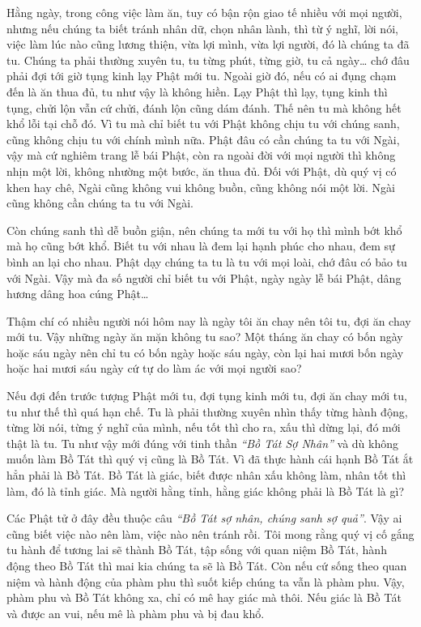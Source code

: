 \documentclass[
  12pt,
  oneside]{book}
\begin{document}
Hằng ngày, trong công việc làm ăn, tuy có bận rộn giao tế nhiều với mọi người, nhưng nếu chúng ta biết tránh nhân dữ, chọn nhân lành, thì từ ý nghĩ, lời nói, việc làm lúc nào cũng lương thiện, vừa lợi mình, vừa lợi người, đó là chúng ta đã tu. Chúng ta phải thường xuyên tu, tu từng phút, từng giờ, tu cả ngày\ldots{} chớ đâu phải đợi tới giờ tụng kinh lạy Phật mới tu. Ngoài giờ đó, nếu có ai đụng chạm đến là ăn thua đủ, tu như vậy là không hiền. Lạy Phật thì lạy, tụng kinh thì tụng, chửi lộn vẫn cứ chửi, đánh lộn cũng dám đánh. Thế nên tu mà không hết khổ lỗi tại chỗ đó. Vì tu mà chỉ biết tu với Phật không chịu tu với chúng sanh, cũng không chịu tu với chính mình nữa. Phật đâu có cần chúng ta tu với Ngài, vậy mà cứ nghiêm trang lễ bái Phật, còn ra ngoài đời với mọi người thì không nhịn một lời, không nhường một bước, ăn thua đủ. Đối với Phật, dù quý vị có khen hay chê, Ngài cũng không vui không buồn, cũng không nói một lời. Ngài cũng không cần chúng ta tu với Ngài.

Còn chúng sanh thì dễ buồn giận, nên chúng ta mới tu với họ thì mình bớt khổ mà họ cũng bớt khổ. Biết tu với nhau là đem lại hạnh phúc cho nhau, đem sự bình an lại cho nhau. Phật dạy chúng ta tu là tu với mọi loài, chớ đâu có bảo tu với Ngài. Vậy mà đa số người chỉ biết tu với Phật, ngày ngày lễ bái Phật, dâng hương dâng hoa cúng Phật\ldots{}

Thậm chí có nhiều người nói hôm nay là ngày tôi ăn chay nên tôi tu, đợi ăn chay mới tu. Vậy những ngày ăn mặn không tu sao? Một tháng ăn chay có bốn ngày hoặc sáu ngày nên chỉ tu có bốn ngày hoặc sáu ngày, còn lại hai mươi bốn ngày hoặc hai mươi sáu ngày cứ tự do làm ác với mọi người sao?

Nếu đợi đến trước tượng Phật mới tu, đợi tụng kinh mới tu, đợi ăn chay mới tu, tu như thế thì quá hạn chế. Tu là phải thường xuyên nhìn thấy từng hành động, từng lời nói, từng ý nghĩ của mình, nếu tốt thì cho ra, xấu thì dừng lại, đó mới thật là tu. Tu như vậy mới đúng với tinh thần \emph{``Bồ Tát Sợ Nhân''} và dù không muốn làm Bồ Tát thì quý vị cũng là Bồ Tát. Vì đã thực hành cái hạnh Bồ Tát ắt hẳn phải là Bồ Tát. Bồ Tát là giác, biết được nhân xấu không làm, nhân tốt thì làm, đó là tỉnh giác. Mà người hằng tỉnh, hằng giác không phải là Bồ Tát là gì?

Các Phật tử ở đây đều thuộc câu \emph{``Bồ Tát sợ nhân, chúng sanh sợ quả''}. Vậy ai cũng biết việc nào nên làm, việc nào nên tránh rồi. Tôi mong rằng quý vị cố gắng tu hành để tương lai sẽ thành Bồ Tát, tập sống với quan niệm Bồ Tát, hành động theo Bồ Tát thì mai kia chúng ta sẽ là Bồ Tát. Còn nếu cứ sống theo quan niệm và hành động của phàm phu thì suốt kiếp chúng ta vẫn là phàm phu. Vậy, phàm phu và Bồ Tát không xa, chỉ có mê hay giác mà thôi. Nếu giác là Bồ Tát và được an vui, nếu mê là phàm phu và bị đau khổ.
\end{document}

